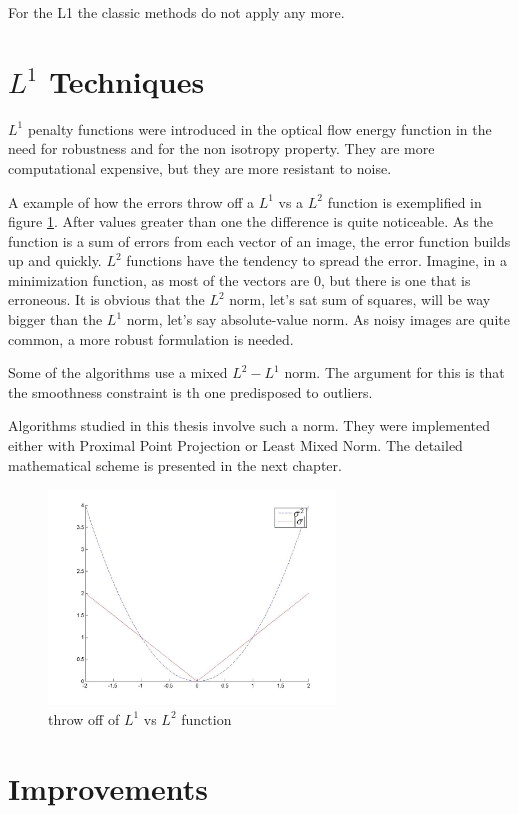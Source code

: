 \documentclass[12pt,a4paper,twoside]{report}
\begin{document}
{For the L1 the classic methods do not apply  any more.


\section{$L^1$ Techniques}

$L^1$ penalty functions were introduced in the optical flow energy function in the need for robustness and for the non isotropy property. They are more computational expensive, but they are more resistant to noise.

 A example of how the errors throw off a $L^1$ vs a $L^2$ function is exemplified in figure \ref{func}. After values greater than one the difference is quite noticeable. As the function is a sum of errors from each vector of an image, the error function builds up and quickly. $L^2$ functions have the tendency to spread the error. Imagine, in a minimization function, as most of the vectors are $0$, but there is one that is erroneous. It is obvious that the $L^2$ norm, let's sat sum of squares, will be way bigger than the $L^1$ norm, let's say absolute-value norm. As noisy images are quite common, a more robust formulation is needed.
 
Some of the algorithms use a mixed  $L^2-L^1$ norm. The argument for this is that the smoothness constraint is th one predisposed to outliers. 
 
Algorithms studied in this thesis involve such a norm. They were implemented either with Proximal Point Projection or Least Mixed Norm. The detailed mathematical scheme is presented in the next chapter.
\begin{figure} \label{func}
	\centering
	\includegraphics[width = 3in]{img/func} 
	\caption{  throw off of $L^1$ vs $L^2$ function }
\end{figure}


\section{Improvements}

}
\end{document}
